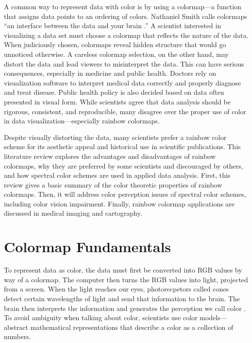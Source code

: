\documentclass[journal,12pt]{IEEEtran}
\begin{document}
A common way to represent data with color is by using a
colormap---a function that assigns data points to
an ordering of colors. Nathaniel Smith
calls colormaps ``an interface between the data and your
brain \cite{viridis}.'' A scientist interested in visualizing a
data set must choose a colormap that reflects the nature of the data. 
When judiciously chosen, colormaps reveal hidden structure that would go unnoticed
otherwise. A careless colormap selection, on the other hand, may distort the data and
lead viewers to misinterpret the data. This can have
serious consequences, especially in medicine and public health.
Doctors rely on visualization software to interpret medical
data correctly and properly diagnose and treat disease.
Public health policy is also decided based on data often presented 
in visual form. While scientists agree that data analysis
should be rigorous, consistent, and reproducible, many disagree over the proper
use of color in data visualization---especially rainbow colormaps.

Despite visually distorting the data, many scientists
prefer a rainbow color scheme for its aesthetic appeal
and historical use in scientific publications. This literature
review explores the advantages and disadvantages
of rainbow colormaps, why they are preferred by some
scientists and discouraged by others, and how spectral color schemes are used
in applied data analysis. First, this review gives a basic summary 
of the color theoretic properties of rainbow colormaps. Then, it will
address color perception issues of spectral color schemes, including
color vision impairment. Finally, rainbow colormap applications are discussed
in medical imaging and cartography.

\section{Colormap Fundamentals}

To represent data as color, the data must first be converted into RGB values by way of 
a colormap. The computer then turns the RGB values into light, projected from a screen.
When the light reaches our eyes, photorecpetors called cones detect certain wavelengths
of light and send that information to the brain. The brain then interprets the information
and generates the perception we call color \cite{viridis}.
To avoid ambiguity when talking about color, scientists use
color models---abstract mathematical representations that
describe a color as a collection of numbers.
\end{document}

